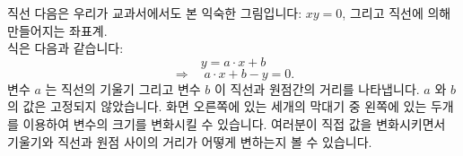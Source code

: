 \begin{surferPage}{직선}
다음은 우리가 교과서에서도 본 익숙한 그림입니다: $xy=0$, 그리고 직선에 의해 만들어지는 좌표계. \\식은 다음과 같습니다:
\[y=a\cdot x + b\]
\[ \Rightarrow \quad a\cdot x +b -y=0.\]
변수 $a$ 는  직선의 기울기 그리고 변수 $b$ 이 직선과 원점간의 거리를 나타냅니다.
\newline \newline
$a$ 와 $b$ 의 값은 고정되지 않았습니다. 화면 오른쪽에 있는 세개의 막대기 중 왼쪽에 있는 두개를 이용하여 변수의 크기를 변화시킬 수 있습니다. 여러분이 직접 값을 변화시키면서 기울기와 직선과 원점 사이의 거리가 어떻게 변하는지 볼 수 있습니다.
\end{surferPage}
